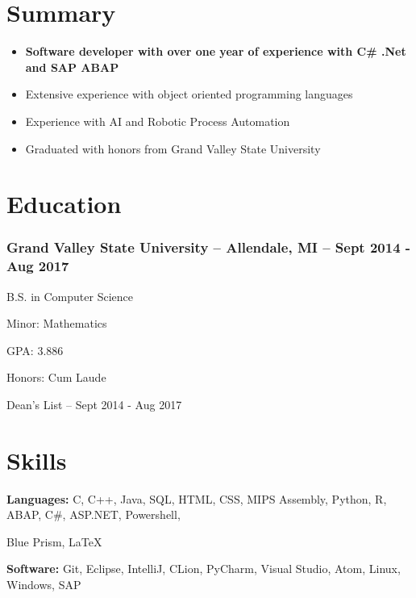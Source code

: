 \documentclass{article}
\begin{document}
	\hfill				%


  \section*{Summary}
  \begin{itemize}
    \itemsep-0.5em
  	\item \textbf{Software developer with over one year of experience with C\# .Net and SAP ABAP}
    \item Extensive experience with object oriented programming languages
    \item Experience with AI and Robotic Process Automation
    \item Graduated with honors from Grand Valley State University
  \end{itemize}

	\section*{Education}

		\subsubsection{Grand Valley State University -- Allendale, MI -- Sept 2014 - Aug 2017}
			\begin{addmargin}[1em]{0em}

				B.S. in Computer Science

				Minor: Mathematics

				GPA: 3.886

				Honors: Cum Laude

				\hspace{13mm}Dean's List -- Sept 2014 - Aug 2017

			\end{addmargin}

	\section*{Skills}
	\begin{addmargin}[0em]{0em}
		\textbf{Languages:} C, C++, Java, SQL, HTML, CSS, MIPS Assembly, Python, R, ABAP, C\#, ASP.NET, Powershell,

    \hspace{21mm}Blue Prism, \LaTeX

		\textbf{Software:} \hspace{1.5mm} Git, Eclipse, IntelliJ, CLion, PyCharm, Visual Studio, Atom, Linux, Windows, SAP
	\end{addmargin}
\end{document}
